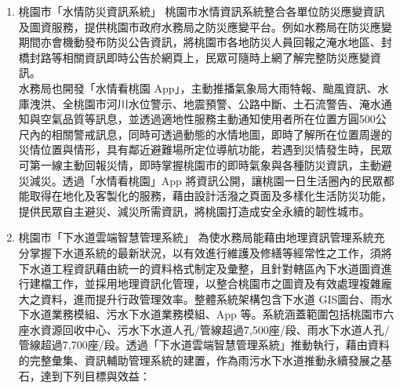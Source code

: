 \documentclass[a4paper,12pt]{article}
\begin{document}
\begin{enumerate}
\item 桃園市「水情防災資訊系統」
\label{sec:orgcf5de9d}
桃園市水情資訊系統整合各單位防災應變資訊及圖資服務，提供桃園市政府水務局之防災應變平台。例如水務局在防災應變期間亦會機動發布防災公告資訊，將桃園市各地防災人員回報之淹水地區、封橋封路等相關資訊即時公告於網頁上，民眾可隨時上網了解完整防災應變資訊。\\

水務局也開發「水情看桃園 App」，主動推播氣象局大雨特報、颱風資訊、水庫洩洪、全桃園市河川水位警示、地震預警、公路中斷、土石流警告、淹水通知與空氣品質等訊息，並透過適地性服務主動通知使用者所在位置方圓500公尺內的相關警戒訊息，同時可透過動態的水情地圖，即時了解所在位置周邊的災情位置與情形，具有鄰近避難場所定位導航功能，若遇到災情發生時，民眾可第一線主動回報災情，即時掌握桃園市的即時氣象與各種防災資訊，主動避災減災。透過「水情看桃園」App 將資訊公開，讓桃園一日生活圈內的民眾都能取得在地化及客製化的服務，藉由設計活潑之頁面及多樣化生活防災功能，提供民眾自主避災、減災所需資訊，將桃園打造成安全永續的韌性城市。\\
\item 桃園市「下水道雲端智慧管理系統」
\label{sec:org3d16b0a}
為使水務局能藉由地理資訊管理系統充分掌握下水道系統的最新狀況，以有效進行維護及修繕等經常性之工作，須將下水道工程資訊藉由統一的資料格式制定及彙整，且針對轄區內下水道圖資進行建檔工作，並採用地理資訊化管理，以整合桃園市之圖資及有效處理複雜龐大之資料，進而提升行政管理效率。整體系統架構包含下水道 GIS圖台、雨水下水道業務模組、污水下水道業務模組、App 等。系統涵蓋範圍包括桃園市六座水資源回收中心、污水下水道人孔/管線超過7,500座/段、雨水下水道人孔/管線超過7,700座/段。透過「下水道雲端智慧管理系統」推動執行，藉由資料的完整彙集、資訊輔助管理系統的建置，作為雨污水下水道推動永續發展之基石，達到下列目標與效益：\\


\end{enumerate}
\end{document}

